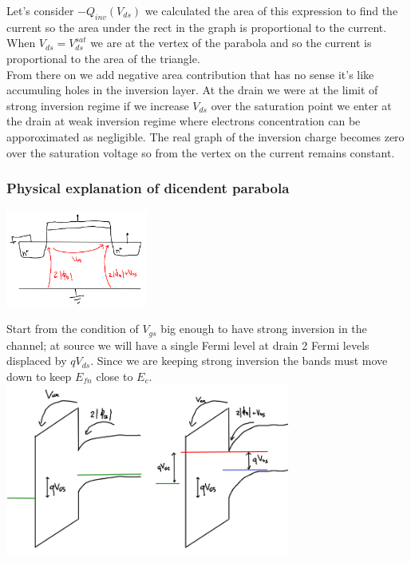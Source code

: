 Let's consider $-Q_{inv}(V_{ds})$ we calculated the area of this expression to find the current so the area under the rect in the graph is proportional to the current. When $V_{ds}=V_{ds}^{sat}$ we are at the vertex of the parabola and so the current is proportional to the area of the triangle.\\
From there on we add negative area contribution that has no sense it's like accumuling holes in the inversion layer. At the drain we were at the limit of strong inversion regime if we increase $V_{ds}$ over the saturation point we enter at the drain at weak inversion regime where electrons concentration can be apporoximated as negligible. The real graph of the inversion charge becomes zero over the saturation voltage so from the vertex on the current remains constant.\\

\subsubsection{Physical explanation of dicendent parabola}


\centering
\includegraphics[width=0.35\textwidth]{f1.png}\\
\raggedright

Start from the condition of $V_{gs}$ big enough to have strong inversion in the channel; at source we will have a single Fermi level at drain 2 Fermi levels displaced by $qV_{ds}$. Since we are keeping strong inversion the bands must move down to keep $E_{fn}$ close to $E_c$.\\

\centering
\includegraphics[width=0.7\textwidth]{f2.png}\\
\raggedright


